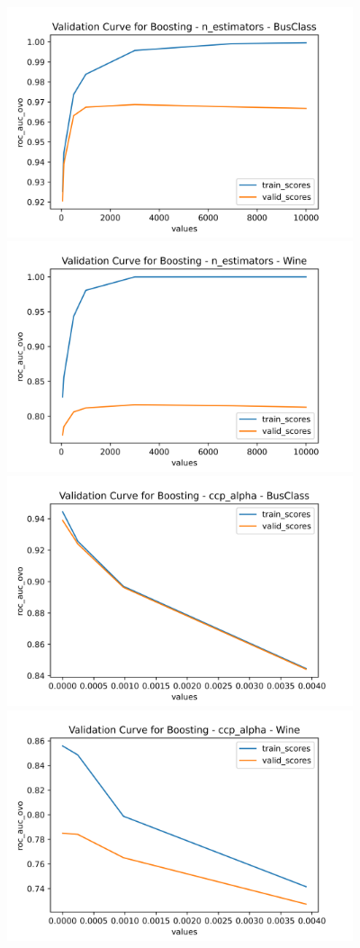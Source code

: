 \documentclass[
	letterpaper, %
]{jdf}
\begin{document}
\includegraphics[width=4in]{Figures/BusClass-0920/GBM/val_curve_0.png}
\includegraphics[width=4in]{Figures/Wine-0921/GBM/val_curve_0.png}
\includegraphics[width=4in]{Figures/BusClass-0920/GBM/val_curve_1.png}
\includegraphics[width=4in]{Figures/Wine-0921/GBM/val_curve_1.png}
\end{document}
